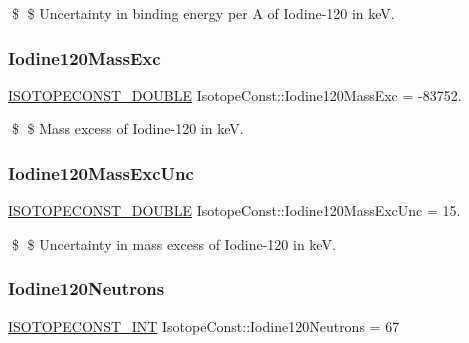\$ \$ Uncertainty in binding energy per A of Iodine-\/120 in keV. \mbox{\label{group___isotope_const-_iodine-_i120_ga347dc4e36dfa8c6646157fe11f1d2bbf}} 
\subsubsection{\texorpdfstring{Iodine120\+Mass\+Exc}{Iodine120MassExc}}
{\footnotesize\ttfamily \mbox{\hyperlink{group___isotope_const-_macros_ga8f45a7272ce02c0b4c65c44636ed719a}{I\+S\+O\+T\+O\+P\+E\+C\+O\+N\+S\+T\+\_\+\+D\+O\+U\+B\+LE}} Isotope\+Const\+::\+Iodine120\+Mass\+Exc = -\/83752.}

\$ \$ Mass excess of Iodine-\/120 in keV. \mbox{\label{group___isotope_const-_iodine-_i120_gaa4b48d1086a7e14ec10d20da69bf10af}} 
\subsubsection{\texorpdfstring{Iodine120\+Mass\+Exc\+Unc}{Iodine120MassExcUnc}}
{\footnotesize\ttfamily \mbox{\hyperlink{group___isotope_const-_macros_ga8f45a7272ce02c0b4c65c44636ed719a}{I\+S\+O\+T\+O\+P\+E\+C\+O\+N\+S\+T\+\_\+\+D\+O\+U\+B\+LE}} Isotope\+Const\+::\+Iodine120\+Mass\+Exc\+Unc = 15.}

\$ \$ Uncertainty in mass excess of Iodine-\/120 in keV. \mbox{\label{group___isotope_const-_iodine-_i120_ga9221e4197d9e3240b994f5353d030338}} 
\subsubsection{\texorpdfstring{Iodine120\+Neutrons}{Iodine120Neutrons}}
{\footnotesize\ttfamily \mbox{\hyperlink{group___isotope_const-_macros_ga5f18360b3e99483a35c32d789e62621c}{I\+S\+O\+T\+O\+P\+E\+C\+O\+N\+S\+T\+\_\+\+I\+NT}} Isotope\+Const\+::\+Iodine120\+Neutrons = 67}

